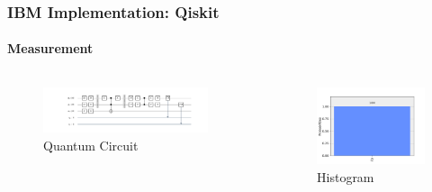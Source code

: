 \begin{frame}[fragile]{}
	\frametitle{IBM Implementation: Qiskit}
	\framesubtitle{Measurement}
	\begin{columns}
		\begin{column}{0.75\textwidth}
			\begin{figure}
				\includegraphics[trim=190 0 190 0,width=0.9\textwidth]{code/data/images/qiskit-circuit.png}
				\caption{Quantum Circuit}
			\end{figure}
		\end{column}
		\begin{column}{0.25\textwidth}  %
			\begin{figure}
				\includegraphics[width=\textwidth]{code/data/images/qiskit-histogram.png}
				\caption{Histogram}
			\end{figure}
		\end{column}
	\end{columns}
\end{frame}	

